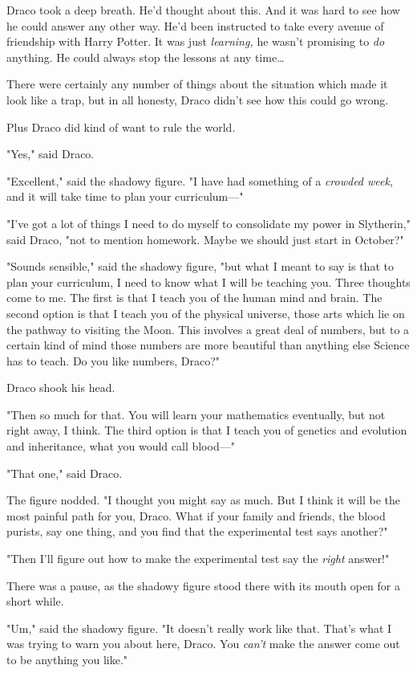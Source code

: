 Draco took a deep breath. He'd thought about this. And it was hard to see how 
he could answer any other way. He'd been instructed to take every avenue of 
friendship with Harry Potter. It was just \emph{learning,} he wasn't promising 
to \emph{do} anything. He could always stop the lessons at any time{\ldots}

There were certainly any number of things about the situation which made it 
look like a trap, but in all honesty, Draco didn't see how this could go wrong.

Plus Draco did kind of want to rule the world.

"Yes," said Draco.

"Excellent," said the shadowy figure. "I have had something of a \emph{crowded 
week}, and it will take time to plan your curriculum---"

"I've got a lot of things I need to do myself to consolidate my power in 
Slytherin," said Draco, "not to mention homework. Maybe we should just start in 
October?"

"Sounds sensible," said the shadowy figure, "but what I meant to say is that to 
plan your curriculum, I need to know what I will be teaching you. Three 
thoughts come to me. The first is that I teach you of the human mind and brain. 
The second option is that I teach you of the physical universe, those arts 
which lie on the pathway to visiting the Moon. This involves a great deal of 
numbers, but to a certain kind of mind those numbers are more beautiful than 
anything else Science has to teach. Do you like numbers, Draco?"

Draco shook his head.

"Then so much for that. You will learn your mathematics eventually, but not 
right away, I think. The third option is that I teach you of genetics and 
evolution and inheritance, what you would call blood---"

"That one," said Draco.

The figure nodded. "I thought you might say as much. But I think it will be the 
most painful path for you, Draco. What if your family and friends, the blood 
purists, say one thing, and you find that the experimental test says another?"

"Then I'll figure out how to make the experimental test say the \emph{right} 
answer!"

There was a pause, as the shadowy figure stood there with its mouth open for a 
short while.

"Um," said the shadowy figure. "It doesn't really work like that. That's what I 
was trying to warn you about here, Draco. You \emph{can't} make the answer come 
out to be anything you like."

